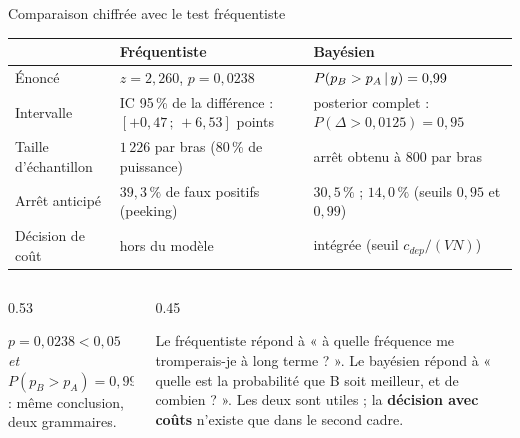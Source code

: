 \begin{frame}{Comparaison chiffrée avec le test fréquentiste}
\begin{center}
\footnotesize
\begin{tabular}{@{}p{4.0cm}p{4.4cm}p{4.4cm}@{}}
\toprule
& \textbf{Fréquentiste} & \textbf{Bayésien} \\
\midrule
Énoncé & $z = 2{,}260$, $p = 0{,}0238$ & $P(p_B > p_A \,\vert\, y) = 0{,}99$ \\[1.2mm]
Intervalle & IC 95\,\% de la différence : $[+0{,}47\,;\,+6{,}53]$ points &
posterior complet : $P(\Delta>0{,}0125) = 0{,}95$ \\[1.2mm]
Taille d'échantillon & $1\,226$ par bras (80\,\% de puissance) & arrêt obtenu à $800$ par bras \\[1.2mm]
Arrêt anticipé & $39{,}3\,\%$ de faux positifs (peeking) &
$30{,}5\,\%$ ; $14{,}0\,\%$ (seuils $0{,}95$ et $0{,}99$) \\[1.2mm]
Décision de coût & hors du modèle & intégrée (seuil $c_{dep}/(VN)$) \\
\bottomrule
\end{tabular}
\end{center}
\vspace{1mm}
\begin{columns}[t]
\begin{column}{0.53\textwidth}
\begin{ebox}
$p = 0{,}0238 < 0{,}05$ \emph{et} $P(p_B > p_A) = 0{,}99 > 0{,}95$ :
même conclusion, deux grammaires.
\end{ebox}
\end{column}
\begin{column}{0.45\textwidth}
\begin{wbox}
Le fréquentiste répond à « à quelle fréquence me tromperais-je à long
terme ? ». Le bayésien répond à « quelle est la probabilité que B soit
meilleur, et de combien ? ». Les deux sont utiles ; la
\textbf{décision avec coûts} n'existe que dans le second cadre.
\end{wbox}
\end{column}
\end{columns}
\end{frame}

